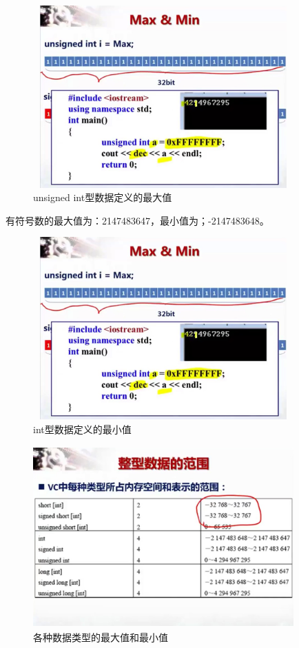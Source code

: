 \documentclass[UTF8]{article}
\begin{document}
\begin{figure}[!htb]
\centering
\includegraphics[width=10cm,height=7cm]{max.jpg}
\caption{unsigned int型数据定义的最大值}
\hspace{0.05in}
\end{figure}

有符号数的最大值为：2147483647，最小值为；-2147483648。
\begin{figure}[!htb]
\centering
\includegraphics[width=10cm,height=7cm]{max.jpg}
\caption{int型数据定义的最小值}
\hspace{0.05in}
\end{figure}

\begin{figure}[!htb]
\centering
\includegraphics[width=10cm,height=7cm]{maxandmin.jpg}
\caption{各种数据类型的最大值和最小值}
\hspace{0.05in}
\end{figure}
\end{document}
